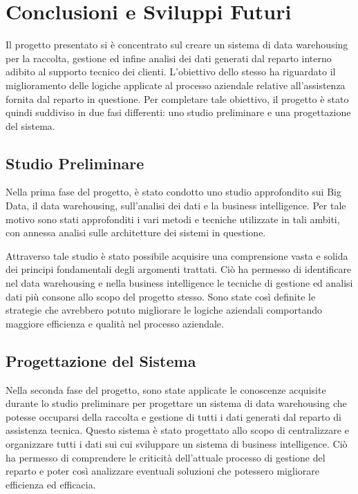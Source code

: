 \chapter{Conclusioni e Sviluppi Futuri}
Il progetto presentato si è concentrato sul creare un sistema di data warehousing per la raccolta, gestione ed infine analisi dei dati generati dal reparto interno adibito al supporto tecnico dei clienti. L'obiettivo dello stesso ha riguardato il miglioramento delle logiche applicate al processo aziendale relative all'assistenza fornita dal reparto in questione. Per completare tale obiettivo, il progetto è stato quindi suddiviso in due fasi differenti: uno studio preliminare e una progettazione del sistema.

\section{Studio Preliminare}

Nella prima fase del progetto, è stato condotto uno studio approfondito sui Big Data, il data warehousing, sull'analisi dei dati e la business intelligence. Per tale motivo sono stati approfonditi i vari metodi e tecniche utilizzate in tali ambiti, con annessa analisi sulle architetture dei sistemi in questione.

Attraverso tale studio è stato possibile acquisire una comprensione vasta e solida dei principi fondamentali degli argomenti trattati. Ciò ha permesso di identificare nel data warehousing e nella business intelligence le tecniche di gestione ed analisi dati più consone allo scopo del progetto stesso. Sono state così definite le strategie che avrebbero potuto migliorare le logiche aziendali comportando maggiore efficienza e qualità nel processo aziendale. 

\section{Progettazione del Sistema}

Nella seconda fase del progetto, sono state applicate le conoscenze acquisite durante lo studio preliminare per progettare un sistema di data warehousing che potesse occuparsi della raccolta e gestione di tutti i dati generati dal reparto di assistenza tecnica. Questo sistema è stato progettato allo scopo di centralizzare e organizzare tutti i dati sui cui sviluppare un sistema di business intelligence. Ciò ha permesso di comprendere le criticità dell'attuale processo di gestione del reparto e poter così analizzare eventuali soluzioni che potessero migliorare efficienza ed efficacia.

